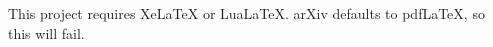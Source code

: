 \documentclass{article}
\begin{document}
This project requires XeLaTeX or LuaLaTeX.
arXiv defaults to pdfLaTeX, so this will fail.
\end{document}
